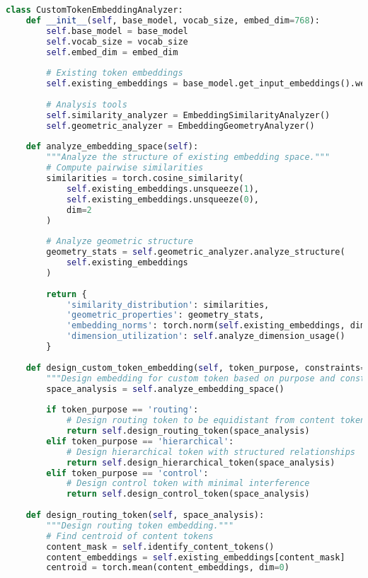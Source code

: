 \begin{lstlisting}[language=Python, caption=Embedding space analysis for custom token design]
class CustomTokenEmbeddingAnalyzer:
    def __init__(self, base_model, vocab_size, embed_dim=768):
        self.base_model = base_model
        self.vocab_size = vocab_size
        self.embed_dim = embed_dim
        
        # Existing token embeddings
        self.existing_embeddings = base_model.get_input_embeddings().weight
        
        # Analysis tools
        self.similarity_analyzer = EmbeddingSimilarityAnalyzer()
        self.geometric_analyzer = EmbeddingGeometryAnalyzer()
        
    def analyze_embedding_space(self):
        """Analyze the structure of existing embedding space."""
        # Compute pairwise similarities
        similarities = torch.cosine_similarity(
            self.existing_embeddings.unsqueeze(1),
            self.existing_embeddings.unsqueeze(0),
            dim=2
        )
        
        # Analyze geometric structure
        geometry_stats = self.geometric_analyzer.analyze_structure(
            self.existing_embeddings
        )
        
        return {
            'similarity_distribution': similarities,
            'geometric_properties': geometry_stats,
            'embedding_norms': torch.norm(self.existing_embeddings, dim=1),
            'dimension_utilization': self.analyze_dimension_usage()
        }
    
    def design_custom_token_embedding(self, token_purpose, constraints=None):
        """Design embedding for custom token based on purpose and constraints."""
        space_analysis = self.analyze_embedding_space()
        
        if token_purpose == 'routing':
            # Design routing token to be equidistant from content tokens
            return self.design_routing_token(space_analysis)
        elif token_purpose == 'hierarchical':
            # Design hierarchical token with structured relationships
            return self.design_hierarchical_token(space_analysis)
        elif token_purpose == 'control':
            # Design control token with minimal interference
            return self.design_control_token(space_analysis)
        
    def design_routing_token(self, space_analysis):
        """Design routing token embedding."""
        # Find centroid of content tokens
        content_mask = self.identify_content_tokens()
        content_embeddings = self.existing_embeddings[content_mask]
        centroid = torch.mean(content_embeddings, dim=0)
        

\end{lstlisting}
